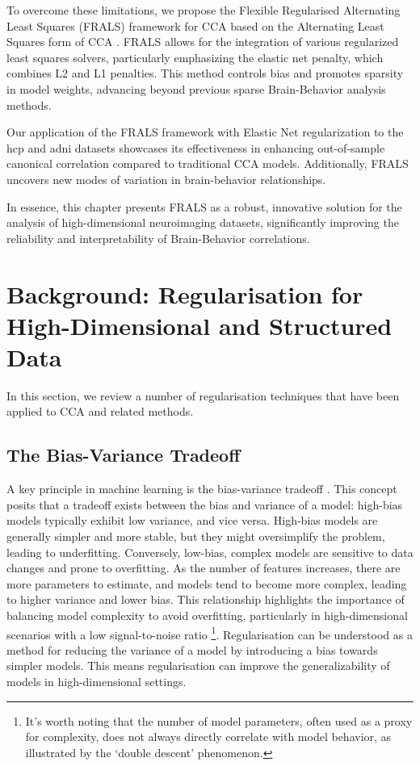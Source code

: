 To overcome these limitations, we propose the Flexible Regularised Alternating Least Squares (FRALS) framework for CCA based on the Alternating Least Squares form of CCA \citep{golub1995canonical}.
FRALS allows for the integration of various regularized least squares solvers, particularly emphasizing the elastic net penalty, which combines L2 and L1 penalties.
This method controls bias and promotes sparsity in model weights, advancing beyond previous sparse Brain-Behavior analysis methods.

Our application of the FRALS framework with Elastic Net regularization to the \acrshort{hcp} and \acrshort{adni} datasets showcases its effectiveness in enhancing out-of-sample canonical correlation compared to traditional CCA models.
Additionally, FRALS uncovers new modes of variation in brain-behavior relationships.

In essence, this chapter presents FRALS as a robust, innovative solution for the analysis of high-dimensional neuroimaging datasets, significantly improving the reliability and interpretability of Brain-Behavior correlations.

\section{Background: Regularisation for High-Dimensional and Structured Data}\label{sec:background}

In this section, we review a number of regularisation techniques that have been applied to CCA and related methods.

\subsection{The Bias-Variance Tradeoff}

A key principle in machine learning is the bias-variance tradeoff \citep{curth2023u, hastie2009elements}.
This concept posits that a tradeoff exists between the bias and variance of a model: high-bias models typically exhibit low variance, and vice versa.
High-bias models are generally simpler and more stable, but they might oversimplify the problem, leading to underfitting.
Conversely, low-bias, complex models are sensitive to data changes and prone to overfitting.
As the number of features increases, there are more parameters to estimate, and models tend to become more complex, leading to higher variance and lower bias.
This relationship highlights the importance of balancing model complexity to avoid overfitting, particularly in high-dimensional scenarios with a low signal-to-noise ratio \citep{mcintosh2021comparison}\footnote{It's worth noting that the number of model parameters, often used as a proxy for complexity, does not always directly correlate with model behavior, as illustrated by the `double descent' phenomenon.}.
Regularisation can be understood as a method for reducing the variance of a model by introducing a bias towards simpler models.
This means regularisation can improve the generalizability of models in high-dimensional settings.

